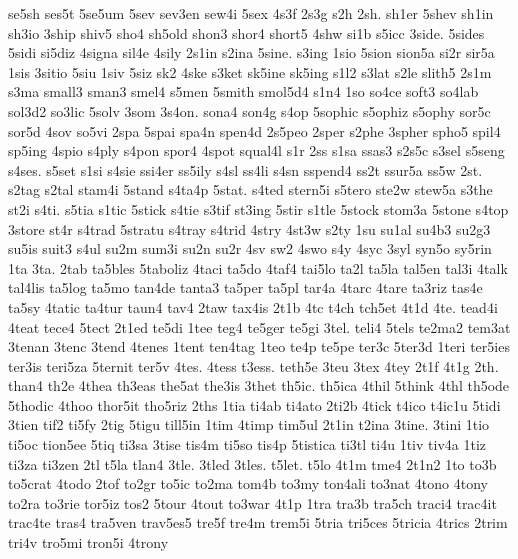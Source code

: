{se5sh 
ses5t 
5se5um 
5sev 
sev3en 
sew4i 
5sex 
4s3f 
2s3g 
s2h 
2sh. 
sh1er 
5shev 
sh1in 
sh3io 
3ship 
shiv5 
sho4 
sh5old 
shon3 
shor4 
short5 
4shw 
si1b 
s5icc 
3side. 
5sides 
5sidi 
si5diz 
4signa 
sil4e 
4sily 
2s1in 
s2ina 
5sine. 
s3ing 
1sio 
5sion 
sion5a 
si2r 
sir5a 
1sis 
3sitio 
5siu 
1siv 
5siz 
sk2 
4ske 
s3ket 
sk5ine 
sk5ing 
s1l2 
s3lat 
s2le 
slith5 
2s1m 
s3ma 
small3 
sman3 
smel4 
s5men 
5smith 
smol5d4 
s1n4 
1so 
so4ce 
soft3 
so4lab 
sol3d2 
so3lic 
5solv 
3som 
3s4on. 
sona4 
son4g 
s4op 
5sophic 
s5ophiz 
s5ophy 
sor5c 
sor5d 
4sov 
so5vi 
2spa 
5spai 
spa4n 
spen4d 
2s5peo 
2sper 
s2phe 
3spher 
spho5 
spil4 
sp5ing 
4spio 
s4ply 
s4pon 
spor4 
4spot 
squal4l 
s1r 
2ss 
s1sa 
ssas3 
s2s5c 
s3sel 
s5seng 
s4ses. 
s5set 
s1si 
s4sie 
ssi4er 
ss5ily 
s4sl 
ss4li 
s4sn 
sspend4 
ss2t 
ssur5a 
ss5w 
2st. 
s2tag 
s2tal 
stam4i 
5stand 
s4ta4p 
5stat. 
s4ted 
stern5i 
s5tero 
ste2w 
stew5a 
s3the 
st2i 
s4ti. 
s5tia 
s1tic 
5stick 
s4tie 
s3tif 
st3ing 
5stir 
s1tle 
5stock 
stom3a 
5stone 
s4top 
3store 
st4r 
s4trad 
5stratu 
s4tray 
s4trid 
4stry 
4st3w 
s2ty 
1su 
su1al 
su4b3 
su2g3 
su5is 
suit3 
s4ul 
su2m 
sum3i 
su2n 
su2r 
4sv 
sw2 
4swo 
s4y 
4syc 
3syl 
syn5o 
sy5rin 
1ta 
3ta. 
2tab 
ta5bles 
5taboliz 
4taci 
ta5do 
4taf4 
tai5lo 
ta2l 
ta5la 
tal5en 
tal3i 
4talk 
tal4lis 
ta5log 
ta5mo 
tan4de 
tanta3 
ta5per 
ta5pl 
tar4a 
4tarc 
4tare 
ta3riz 
tas4e 
ta5sy 
4tatic 
ta4tur 
taun4 
tav4 
2taw 
tax4is 
2t1b 
4tc 
t4ch 
tch5et 
4t1d 
4te. 
tead4i 
4teat 
tece4 
5tect 
2t1ed 
te5di 
1tee 
teg4 
te5ger 
te5gi 
3tel. 
teli4 
5tels 
te2ma2 
tem3at 
3tenan 
3tenc 
3tend 
4tenes 
1tent 
ten4tag 
1teo 
te4p 
te5pe 
ter3c 
5ter3d 
1teri 
ter5ies 
ter3is 
teri5za 
5ternit 
ter5v 
4tes. 
4tess 
t3ess. 
teth5e 
3teu 
3tex 
4tey 
2t1f 
4t1g 
2th. 
than4 
th2e 
4thea 
th3eas 
the5at 
the3is 
3thet 
th5ic. 
th5ica 
4thil 
5think 
4thl 
th5ode 
5thodic 
4thoo 
thor5it 
tho5riz 
2ths 
1tia 
ti4ab 
ti4ato 
2ti2b 
4tick 
t4ico 
t4ic1u 
5tidi 
3tien 
tif2 
ti5fy 
2tig 
5tigu 
till5in 
1tim 
4timp 
tim5ul 
2t1in 
t2ina 
3tine. 
3tini 
1tio 
ti5oc 
tion5ee 
5tiq 
ti3sa 
3tise 
tis4m 
ti5so 
tis4p 
5tistica 
ti3tl 
ti4u 
1tiv 
tiv4a 
1tiz 
ti3za 
ti3zen 
2tl 
t5la 
tlan4 
3tle. 
3tled 
3tles. 
t5let. 
t5lo 
4t1m 
tme4 
2t1n2 
1to 
to3b 
to5crat 
4todo 
2tof 
to2gr 
to5ic 
to2ma 
tom4b 
to3my 
ton4ali 
to3nat 
4tono 
4tony 
to2ra 
to3rie 
tor5iz 
tos2 
5tour 
4tout 
to3war 
4t1p 
1tra 
tra3b 
tra5ch 
traci4 
trac4it 
trac4te 
tras4 
tra5ven 
trav5es5 
tre5f 
tre4m 
trem5i 
5tria 
tri5ces 
5tricia 
4trics 
2trim 
tri4v 
tro5mi 
tron5i 
4trony 
}
